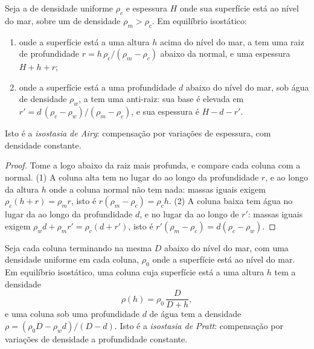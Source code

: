 \begin{proposition}\label{prop:b1:isostasy-gravity:airy}
Seja a  de densidade uniforme $\rho_c$ e espessura $H$ onde sua
superfície está ao nível do mar, sobre um  de densidade $\rho_m > \rho_c$. Em equilíbrio
isostático:
\begin{enumerate}
  \item onde a superfície está a uma altura $h$ acima do nível do mar, a  tem
        uma raiz de profundidade $r = h\,\rho_c/(\rho_m - \rho_c)$ abaixo da  normal,
        e uma espessura $H + h + r$;
  \item onde a superfície está a uma profundidade $d$ abaixo do nível do mar, sob água de
        densidade $\rho_w$, a  tem uma anti-raiz: sua base é elevada em
        $r' = d\,(\rho_c - \rho_w)/(\rho_m - \rho_c)$, e sua espessura é
        $H - d - r'$.
\end{enumerate}
Isto é a \emph{isostasia de Airy}: compensação por variações de
espessura, com densidade constante.
\end{proposition}

\begin{proof}
Tome a  logo abaixo da raiz mais profunda, e compare cada
coluna com a normal. (1) A coluna alta tem  no lugar do 
ao longo da profundidade $r$, e  ao longo da altura $h$ onde a coluna normal não tem
nada: massas iguais exigem $\rho_c(h + r) = \rho_m r$, isto é
$r(\rho_m - \rho_c) = \rho_c h$. (2) A coluna baixa tem água no lugar da 
ao longo da profundidade $d$, e  no lugar da  ao longo de $r'$: massas iguais exigem
$\rho_w d + \rho_m r' = \rho_c(d + r')$, isto é $r'(\rho_m - \rho_c) =
d(\rho_c - \rho_w)$.
\end{proof}

\begin{proposition}\label{prop:b1:isostasy-gravity:pratt}
Seja cada coluna terminando na mesma  $D$ abaixo do nível do mar, com uma
densidade uniforme em cada coluna, $\rho_0$ onde a superfície está ao nível do mar. Em
equilíbrio isostático, uma coluna cuja superfície está a uma altura $h$ tem a
densidade
\[
  \rho(h) = \rho_0\,\frac{D}{D + h},
\]
e uma coluna sob uma profundidade $d$ de água tem a densidade
$\rho = (\rho_0 D - \rho_w d)/(D - d)$. Isto é a \emph{isostasia de Pratt}: compensação por variações de densidade a
profundidade constante.
\end{proposition}


